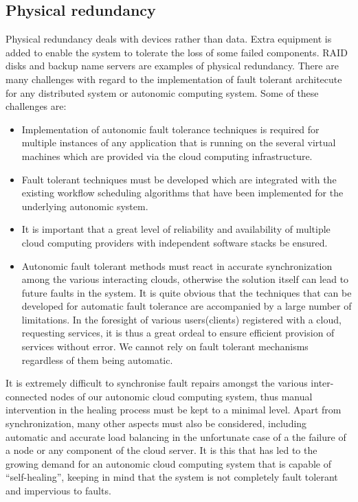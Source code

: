 \subsection{Physical redundancy}
Physical redundancy deals with devices rather than data. Extra equipment is added to enable the system to tolerate the loss of some failed components. RAID disks and backup name servers are examples of physical redundancy. 
There are many challenges with regard to the implementation of fault tolerant architecute for any distributed system or autonomic computing system. Some of these challenges are:
	\begin{itemize}
		\item Implementation of autonomic fault tolerance techniques is required for multiple instances of any application that is running on the several virtual machines which are provided via the cloud computing infrastructure.
		\item Fault tolerant techniques must be developed which are integrated with the existing workflow scheduling algorithms that have been implemented for the underlying autonomic system.
		\item It is important that a great level of reliability and availability of multiple cloud computing providers with independent software stacks be ensured. 
		\item Autonomic fault tolerant methods must react in accurate synchronization among the various interacting clouds, otherwise the solution itself can lead to future faults in the system.
It is quite obvious that the techniques that can be developed for automatic fault tolerance are accompanied by a large number of limitations. In the foresight of various users(clients) registered with a cloud, requesting services, it is thus a great ordeal to ensure efficient provision of services without error. We cannot rely on fault tolerant mechanisms regardless of them being automatic.
	\end{itemize}
It is extremely difficult to synchronise fault repairs amongst the various inter-connected nodes of our autonomic cloud computing system, thus manual intervention in the healing process must be kept to a minimal level. Apart from synchronization, many other aspects must also be considered, including automatic and accurate load balancing in the unfortunate case of a the failure of a node or any component of the cloud server. It is this that has led to the growing demand for an autonomic cloud computing system that is capable of “self-healing”, keeping in mind that the system is not completely fault tolerant and impervious to faults.
